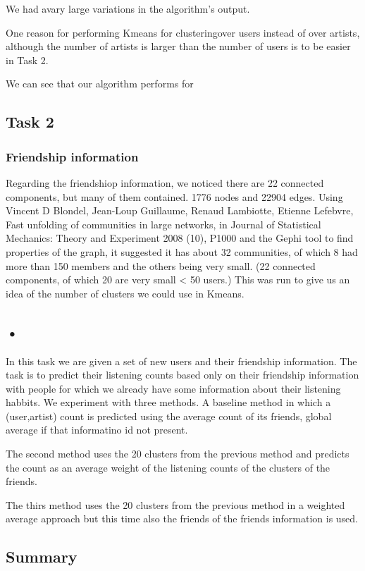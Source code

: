 We had avary large variations in the algorithm's output.

One reason for performing Kmeans for clusteringover users 
instead of over artists, although the number of artists is larger than the number of users is to be easier in Task 2.



We can see that our algorithm performs for

\subsection{Task 2}
\subsubsection{Friendship information}
Regarding the friendshiop information, we noticed there are 22 connected components, but many of them contained.
1776 nodes and 22904 edges.
Using Vincent D Blondel, Jean-Loup Guillaume, Renaud Lambiotte, Etienne Lefebvre, Fast unfolding of communities in large networks, in Journal of Statistical Mechanics: Theory and Experiment 2008 (10), P1000 and the Gephi tool to find properties of the graph, it suggested it has about
32 communities, of which 8 had more than 150 members and the others being very small. (22 connected components, of which 20 are very small < 50 users.) This was run to give us an idea of the number of clusters we could use in Kmeans.

\subsection{•}
In this task we are given a set of new users and their friendship information.
The task is to predict their listening counts based only on their friendship information with
people for which we already have some information about their listening habbits.
We experiment with three methods.
 A baseline method in which a (user,artist) count is predicted
using the average count of its friends, global average if that informatino id not present.

The second method uses the 20 clusters from the previous method and predicts the count
as an average weight of the listening counts of the clusters of the friends.

The thirs method uses the 20 clusters from the previous method in a weighted average approach but this time also the friends of the friends information is used. 

\subsection{Summary}



